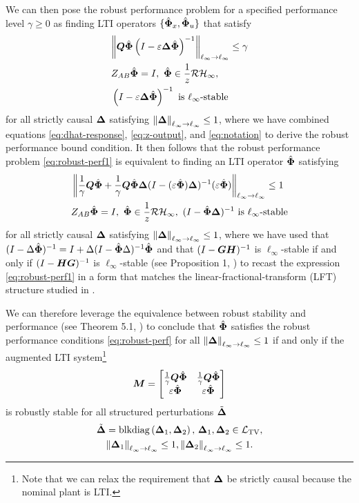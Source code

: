 We can then pose the robust performance problem for a specified performance level $\gamma \geq 0$ as finding LTI operators $\{\hat{\boldsymbol{\Phi}}_x,\hat{\boldsymbol{\Phi}}_u\}$ that satisfy 
\begin{equation}\label{eq:robust-perf1}
\begin{aligned}
&{ \left\lVert \boldsymbol{Q}\hat{\boldsymbol{\Phi}} \left(I-\varepsilon{\boldsymbol{\Delta}}\hat{\boldsymbol{\Phi}}\right)^{-1}  \right\rVert_{\ell_\infty \to \ell_\infty}} \leq \gamma \\
&Z_{AB}\hat{\boldsymbol{\Phi}} = I,\ \hat{\boldsymbol{\Phi}} \in \frac{1}{z}\mathcal{RH}_\infty, \\
& \left(I-\varepsilon{\boldsymbol{\Delta}}\hat{\boldsymbol{\Phi}}\right)^{-1} \text{ is $\ell_\infty$-stable}
\end{aligned}
\end{equation}
for all strictly causal ${\boldsymbol{\Delta}}$ satisfying $\left\|{\boldsymbol{\Delta}}\right\|_{\ell_\infty\to\ell_\infty}\leq 1$, where we have combined equations  \eqref{eq:dhat-response}, \eqref{eq:z-output}, and \eqref{eq:notation} to derive the robust performance bound condition.  It then follows that the robust performance problem \eqref{eq:robust-perf1} is equivalent to finding an LTI operator $\hat{\boldsymbol{\Phi}}$ satisfying
\begin{equation} \label{eq:robust-perf}
\begin{aligned}
& \left\|\frac{1}{\gamma}\boldsymbol{Q}\hat{\boldsymbol{\Phi}} + \frac{1}{\gamma}\boldsymbol{Q}\hat{\boldsymbol{\Phi}}{\boldsymbol{\Delta}}(I-(\varepsilon\hat{\boldsymbol{\Phi}}){\boldsymbol{\Delta}})^{-1}(\varepsilon\hat{\boldsymbol{\Phi}})\right\|_{\ell_\infty\to\ell_\infty} \leq 1 \\
& Z_{AB}\hat{\boldsymbol{\Phi}} = I,\ \hat{\boldsymbol{\Phi}} \in \frac{1}{z}\mathcal{RH}_\infty,\   (I-\hat{\boldsymbol{\Phi}}{\boldsymbol{\Delta}})^{-1} \text{ is $\ell_\infty$-stable}\\
\end{aligned}
\end{equation}
for all strictly causal ${\boldsymbol{\Delta}}$ satisfying $\left\|{\boldsymbol{\Delta}}\right\|_{\ell_\infty\to\ell_\infty}\leq 1$, where we have used that $(I-\Delta\hat{\boldsymbol{\Phi}})^{-1} = I + \Delta(I-\hat{\boldsymbol{\Phi}}\Delta)^{-1}\hat{\boldsymbol{\Phi}}$ and that $(I-\boldsymbol{GH})^{-1}$ is $\ell_\infty$-stable if and only if $(I-\boldsymbol{HG})^{-1}$ is $\ell_\infty$-stable (see Proposition 1, \cite{khammash1990stability}) to recast the expression \eqref{eq:robust-perf1} in a form that matches the linear-fractional-transform (LFT) structure studied in \cite{khammash1990stability,dahleh1994control}.

We can therefore leverage the equivalence between robust stability and performance (see Theorem 5.1, \cite{khammash1990stability}) to conclude that $\hat{\boldsymbol{\Phi}}$ satisfies the robust performance conditions \eqref{eq:robust-perf} for all $\left\|{\boldsymbol{\Delta}}\right\|_{\ell_\infty\to\ell_\infty}\leq 1$ if and only if the augmented LTI system\footnote{Note that we can relax the requirement that ${\boldsymbol{\Delta}}$ be strictly causal because the nominal plant is LTI.}
\begin{equation}
\boldsymbol{M} = \begin{bmatrix} \frac{1}{\gamma}\boldsymbol{Q}\hat{\boldsymbol{\Phi}} & \frac{1}{\gamma}\boldsymbol{Q}\hat{\boldsymbol{\Phi}} \\ \varepsilon\hat{\boldsymbol{\Phi}} & \varepsilon\hat{\boldsymbol{\Phi}} \end{bmatrix}
\label{eq:bigM}
\end{equation}
is robustly stable for all structured perturbations $\tilde{{\boldsymbol{\Delta}}}$ 
\begin{multline}
\tilde{{\boldsymbol{\Delta}}} = \mathrm{blkdiag}\left({\boldsymbol{\Delta}}_1,{\boldsymbol{\Delta}}_2\right), \, {\boldsymbol{\Delta}}_1, {\boldsymbol{\Delta}}_2 \in \mathcal{L}_{\mathrm{TV}}, \\ \left\|{\boldsymbol{\Delta}}_1\right\|_{\ell_\infty\to\ell_\infty} \leq 1, \left\|{\boldsymbol{\Delta}}_2\right\|_{\ell_\infty\to\ell_\infty} \leq 1.
\end{multline}

